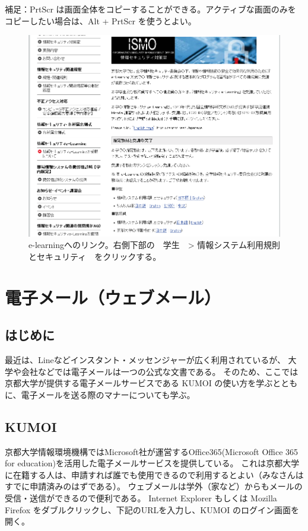 補足：PrtScr は画面全体をコピーすることができる。アクティブな画面のみをコピーしたい場合は、Alt + PrtScr を使うとよい。

\begin{figure}
\centering
\includegraphics[width=13cm]{TeX_files/figs2/e-learning.png}
\caption{
\label{fig:e-learning}
e-learningへのリンク。右側下部の　学生　> 情報システム利用規則とセキュリティ　をクリックする。
}
\end{figure}

\section{電子メール（ウェブメール）}
\subsection{はじめに}
最近は、Lineなどインスタント・メッセンジャーが広く利用されているが、
大学や会社などでは電子メールは一つの公式な文書である。
そのため、ここでは京都大学が提供する電子メールサービスである KUMOI の使い方を学ぶとともに、電子メールを送る際のマナーについても学ぶ。

\subsection{KUMOI}
京都大学情報環境機構ではMicrosoft社が運営するOffice365(Microsoft Office 365 for education)を活用した電子メールサービスを提供している。
これは京都大学に在籍する人は、申請すれば誰でも使用できるので利用するとよい（みなさんはすでに申請済みのはずである）。
ウェブメールは学外（家など）からもメールの受信・送信ができるので便利である。
Internet Explorer もしくは Mozilla Firefox をダブルクリックし、下記のURLを入力し、KUMOI のログイン画面を開く。 

